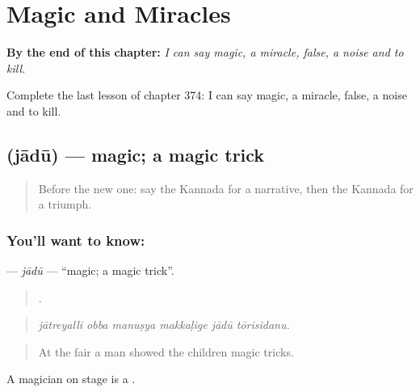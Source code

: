
\chapter{Magic and Miracles}
\label{ch:ka-magic-and-miracles}

\begin{chapteropening}
\textbf{By the end of this chapter:} \emph{I can say magic, a miracle, false, a noise and to kill.}

Complete the last lesson of chapter 374: I can say magic, a miracle, false, a noise and to kill.
\end{chapteropening}

\section[\texorpdfstring{\kn{ಜಾದೂ} (jādū)}{ಜಾದೂ (jādū)}]{ (jādū) — magic; a magic trick}

\label{lesson:KA-C374-jadu-magic}



\begin{quote}
Before the new one: say the Kannada for a narrative, then the Kannada for a triumph.
\end{quote}

\subsection*{You'll want to know: }
\textbf{} — \emph{jādū} — \textquotedblleft{}magic; a magic trick\textquotedblright{}.

\begin{quote}
     .
\end{quote}

\begin{quote}
\emph{jātreyalli obba manuṣya makkaḷige jādū tōrisidanu.}
\end{quote}

\begin{quote}
At the fair a man showed the children magic tricks.
\end{quote}

A magician on stage is a .

